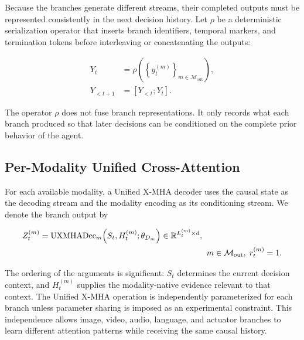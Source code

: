 Because the branches generate different streams, their completed outputs must be represented consistently in the next decision history. Let $\rho$ be a deterministic serialization operator that inserts branch identifiers, temporal markers, and termination tokens before interleaving or concatenating the outputs:

\begin{equation}
\begin{aligned}
    Y_t
    &= \rho\!\left(
       \left\{y_t^{(m)}\right\}_{m\in\mathcal{M}_{\mathrm{out}}}
       \right),\\
    Y_{<t+1}
    &= \left[Y_{<t};Y_t\right].
\end{aligned}
\label{eq:disjoint_history_update}
\end{equation}

The operator $\rho$ does not fuse branch representations. It only records what each branch produced so that later decisions can be conditioned on the complete prior behavior of the agent.

\subsection{\textbf{Per-Modality Unified Cross-Attention}}

For each available modality, a Unified X-MHA decoder uses the causal state as the decoding stream and the modality encoding as its conditioning stream. We denote the branch output by

\begin{equation}
\begin{aligned}
    Z_t^{(m)}
    &= \operatorname{UXMHADec}_{m}\!\left(
       S_t,H_t^{(m)};\theta_{D_m}
       \right)
     \in\mathbb{R}^{L_t^{(m)}\times d},\\
    &\hspace{7.2cm}
       m\in\mathcal{M}_{\mathrm{out}},\;r_t^{(m)}=1.
\end{aligned}
\label{eq:disjoint_cross_attention}
\end{equation}

The ordering of the arguments is significant: $S_t$ determines the current decision context, and $H_t^{(m)}$ supplies the modality-native evidence relevant to that context. The Unified X-MHA operation is independently parameterized for each branch unless parameter sharing is imposed as an experimental constraint. This independence allows image, video, audio, language, and actuator branches to learn different attention patterns while receiving the same causal history.


